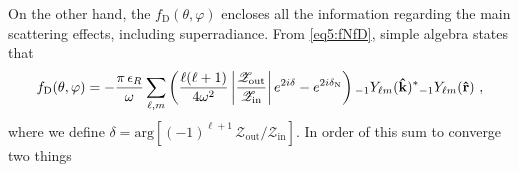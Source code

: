 On the other hand, the $f_\mathrm{D}(\theta,\varphi)$ encloses all the information regarding the main scattering effects, including superradiance.
From \eqref{eq5:fNfD}, simple algebra states that
\begin{align}
    f_\mathrm{D}(\theta,\varphi) = - \frac{\pi \,\epsilon_R}{\omega}
    \sum_{\ell,m} \left( \frac{\ell(\ell+1)}{4 \omega^2} \left| \frac{\mathscr{Z}_\mathrm{out}}{\mathscr{Z}_\mathrm{in}} \right| e^{2 i \delta } - e^{2 i \delta_\mathrm{N} } \right)
    \uu[-1]{Y}{\ell m}(\mathbf{\hat{k}})^{*} \uu[-1]{Y}{\ell m}(\mathbf{\hat{r}}) ~,
\end{align}
where we define $\delta = \mathrm{arg} \left[ (-1)^{\ell+1} \,\mathscr{Z}_\mathrm{out}/\mathscr{Z}_\mathrm{in} \right]$.
In order of this sum to converge two things


\cleardoublepage